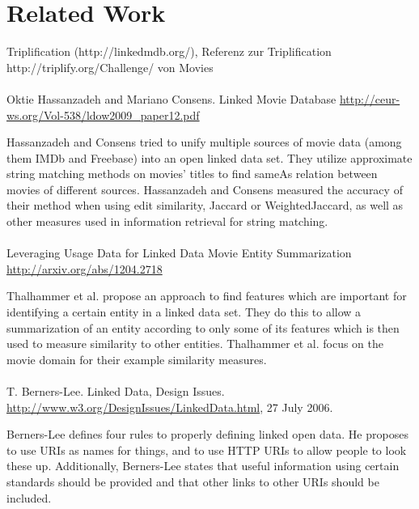 \section{Related Work}
\label{sec_related_work}


Triplification (http://linkedmdb.org/), Referenz zur Triplification http://triplify.org/Challenge/ von Movies\\\\

Oktie Hassanzadeh and Mariano Consens. Linked Movie Database
\url{http://ceur-ws.org/Vol-538/ldow2009_paper12.pdf}

Hassanzadeh and Consens tried to unify multiple sources of movie data (among them IMDb and Freebase) into an open linked data set.
They utilize approximate string matching methods on movies' titles to find sameAs relation between movies of different sources.
Hassanzadeh and Consens measured the accuracy of their method when using edit similarity, Jaccard or WeightedJaccard, as well as other measures used in information retrieval for string matching.\\\\

Leveraging Usage Data for Linked Data Movie Entity Summarization 
\url{http://arxiv.org/abs/1204.2718}

Thalhammer et al. propose an approach to find features which are important for identifying a certain entity in a linked data set.
They do this to allow a summarization of an entity according to only some of its features which is then used to measure similarity to other entities.
Thalhammer et al. focus on the movie domain for their example similarity measures.\\\\

T. Berners-Lee. Linked Data, Design Issues.
\url{http://www.w3.org/DesignIssues/LinkedData.html}, 27 July 2006.

Berners-Lee defines four rules to properly defining linked open data.
He proposes to use URIs as names for things, and to use HTTP URIs to allow people to look these up.
Additionally, Berners-Lee states that useful information using certain standards should be provided and that other links to other URIs should be included.